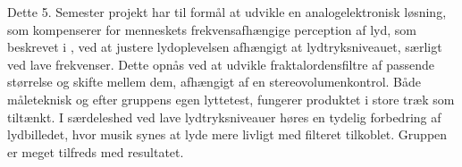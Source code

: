 Dette 5. Semester projekt har til formål at udvikle en analogelektronisk løsning, som kompenserer for menneskets frekvensafhængige perception af lyd, som beskrevet i \textcite{STD:ISO226}, ved at justere lydoplevelsen afhængigt at lydtryksniveauet, særligt ved lave frekvenser. Dette opnås ved at udvikle fraktalordensfiltre af passende størrelse og skifte mellem dem, afhængigt af en stereovolumenkontrol. Både måleteknisk og efter gruppens egen lyttetest, fungerer produktet i store træk som tiltænkt. I særdeleshed ved lave lydtryksniveauer høres en tydelig forbedring af lydbilledet, hvor musik synes at lyde mere livligt med filteret tilkoblet. Gruppen er meget tilfreds med resultatet.